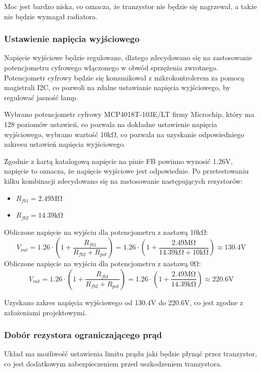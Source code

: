 \documentclass[../../main.tex]{subfiles}
\begin{document}
Moc jest bardzo niska, co oznacza, że tranzystor nie będzie się nagrzewał, a także nie będzie wymagał radiatora.

\subsubsection{Ustawienie napięcia wyjściowego}
Napięcie wyjściowe będzie regulowane, dlatego zdecydowano się na zastosowanie potencjometru cyfrowego włączonego w obwód sprzężenia zwrotnego.
Potencjometr cyfrowy będzie się komunikował z mikrokontrolerem za pomocą magistrali I2C, co pozwoli na zdalne ustawianie napięcia wyjściowego,
by regulować jasność lamp.

Wybrano potencjometr cyfrowy MCP4018T-103E/LT firmy Microchip,
który ma 128 poziomów ustawień, co pozwala na dokładne ustawienie napięcia wyjściowego,
wybrano wartość 10k\si{\ohm}, co pozwala na uzyskanie odpowiedniego zakresu ustawień napięcia wyjściowego.

Zgodnie z kartą katalogową napięcie na pinie FB powinno wynosić 1.26\si{\volt}, napięcie to oznacza, że napięcie wyjściowe jest odpowiednie. 
Po przetestowaniu kilku kombinacji zdecydowano się na zastosowanie następujących rezystorów:
\begin{itemize}
    \item $R_{fb1} = 2.49\si{\mega\ohm}$
    \item $R_{fb2} = 14.39\si{\kilo\ohm}$
\end{itemize}

Obliczone napięcie na wyjściu dla potencjometru z nastawą 10\si{\kilo\ohm}:
\begin{equation}
    V_{out} = 1.26 \cdot (1 + \frac{R_{fb1}}{R_{fb2} + R_{pot}}) = 1.26 \cdot (1 + \frac{2.49\si{\mega\ohm}}{14.39\si{\kilo\ohm} + 10\si{\kilo\ohm}}) \approx 130.4\si{\volt}
\end{equation}
Obliczone napięcie na wyjściu dla potencjometru z nastawą 0\si{\ohm}:
\begin{equation}
    V_{out} = 1.26 \cdot (1 + \frac{R_{fb1}}{R_{fb2} + R_{pot}}) = 1.26 \cdot (1 + \frac{2.49\si{\mega\ohm}}{14.39\si{\kilo\ohm}}) \approx 220.6\si{\volt}
\end{equation}

Uzyskano zakres napięcia wyjściowego od 130.4\si{\volt} do 220.6\si{\volt}, co jest zgodne z założeniami projektowymi.

\subsubsection{Dobór rezystora ograniczającego prąd}
Układ ma możliwość ustawienia limitu prądu jaki będzie płynąć przez tranzystor,
co jest dodatkowym zabezpieczeniem przed uszkodzeniem tranzystora.
\end{document}
